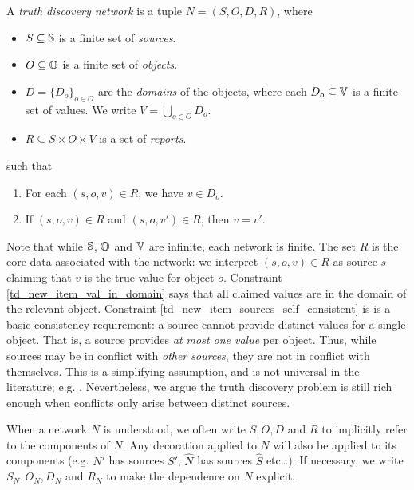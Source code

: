 \begin{definition}
    \label{td_new_def_network}
    A \emph{truth discovery network} is a tuple $N = (S, O, D, R)$, where
    \begin{itemize}
        \item $S \subseteq \S$ is a finite set of \emph{sources}.
        \item $O \subseteq \O$ is a finite set of \emph{objects}.
        \item $D = \{D_o\}_{o \in O}$ are the \emph{domains} of the objects,
              where each $D_o \subseteq \V$ is a finite set of values. We write
              $V = \bigcup_{o \in O}{D_o}$.
        \item $R \subseteq S \times O \times V$ is a set of \emph{reports}.
    \end{itemize}
    such that
    \begin{enumerate}
        \item\label{td_new_item_val_in_domain}
            For each $(s, o, v) \in R$, we have $v \in D_o$.
        \item\label{td_new_item_sources_self_consistent}
            If $(s, o, v) \in R$ and $(s, o, v') \in R$, then $v = v'$.
    \end{enumerate}
\end{definition}

Note that while $\S$, $\O$ and $\V$ are infinite, each network is finite. The
set $R$ is the core data associated with the network: we interpret $(s, o, v)
\in R$ as source $s$ claiming that $v$ is the true value for object $o$.
Constraint \cref{td_new_item_val_in_domain} says that all claimed values are in
the domain of the relevant object. Constraint
\cref{td_new_item_sources_self_consistent} is is a basic consistency requirement:
a source cannot provide distinct values for a single object. That is, a source
provides \emph{at most one value} per object.  Thus, while sources may be in
conflict with \emph{other sources}, they are not in conflict with themselves.
This is a simplifying assumption, and is not universal in the literature; e.g.
. Nevertheless, we argue the truth discovery problem is
still rich enough when conflicts only arise between distinct sources.

When a network $N$ is understood, we often write $S, O, D$ and $R$ to
implicitly refer to the components of $N$. Any decoration applied to $N$ will
also be applied to its components (e.g. $N'$ has sources $S'$, $\hat{N}$ has
sources $\hat{S}$ etc\ldots). If necessary, we write $S_N, O_N, D_N$ and $R_N$
to make the dependence on $N$ explicit.

